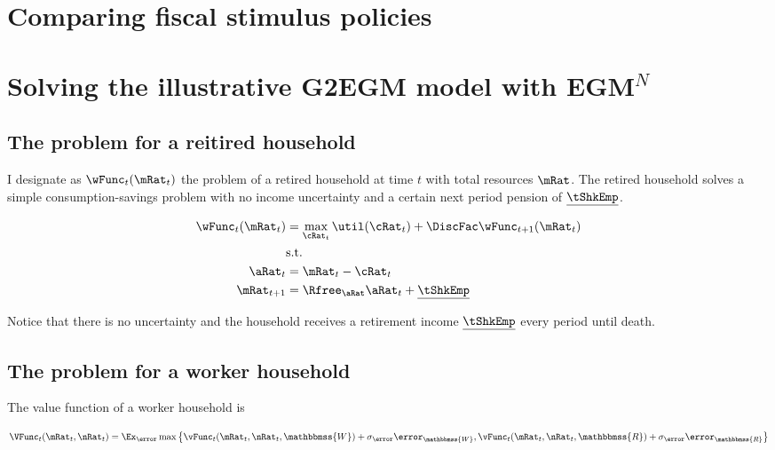 \documentclass[\econtexRoot/HAFiscal]{subfiles}
\begin{document}
\FloatBarrier
\hypertarget{comparing-fiscal-stimulus-policies}{}\par\section{Comparing fiscal stimulus policies}
\notinsubfile{\label{sec:comparing}}

\section{Solving the illustrative G2EGM model with EGM$^N$}

\subsection{The problem for a reitired household}

I designate as $\wFunc_{t}(\mRat_{t})$ the problem of a retired household at time $t$ with total resources $\mRat$. The retired household solves a simple consumption-savings problem with no income uncertainty and a certain next period pension of $\underline{\tShkEmp}$.

\begin{equation}
    \begin{split}
        \wFunc_{t}(\mRat_{t}) & = \max_{\cRat_{t}} \util(\cRat_{t}) +
        \DiscFac \wFunc_{t+1}(\mRat_{t}) \\
        & \text{s.t.} \\
        \aRat_{t} & = \mRat_{t} - \cRat_{t} \\
        \mRat_{t+1} & = \Rfree_{\aRat} \aRat_{t} +
        \underline{\tShkEmp}
    \end{split}
\end{equation}

Notice that there is no uncertainty and the household receives a retirement
income $\underline{\tShkEmp}$ every period until death.

\subsection{The problem for a worker household}

The value function of a worker household is

\providecommand{\Work}{\ensuremath{\mathbbmss{W}}}
\providecommand{\Retire}{\ensuremath{\mathbbmss{R}}}

\begin{equation}
    \VFunc_{t}(\mRat_{t}, \nRat_{t}) = \Ex_\error \max \left\{
    \vFunc_{t}(\mRat_{t}, \nRat_{t}, \Work) + \sigma_{\error}
    \error_{\Work} ,
    \vFunc_{t}(\mRat_{t}, \nRat_{t}, \Retire) + \sigma_{\error}
    \error_{\Retire} \right\}
\end{equation}
\end{document}
